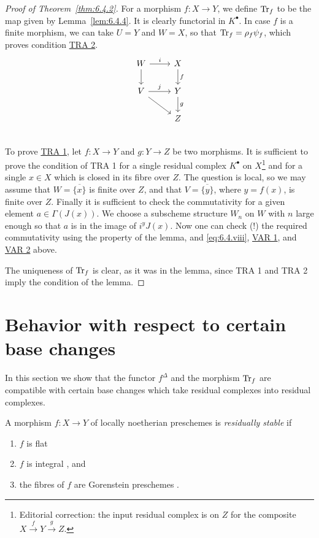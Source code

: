 \begin{proof}[Proof of Theorem~\ref{thm:6.4.2}]
For a morphism $f\colon X\to Y$, we define $\operatorname{Tr}_f$ to be the map given by Lemma~\ref{lem:6.4.4}. It is clearly functorial in $K^\bullet$. In case $f$ is a finite morphism, we can take $U=Y$ and $W=X$, so that $\operatorname{Tr}_f = \rho_f\psi_f$, which proves condition \hyperref[tra:6.4.2]{TRA 2}.
\[\begin{tikzcd}
	W\ar[r,"i"]\ar[d]&X\ar[d,"f"]\\
	V\ar[r,"j"]\ar[rd]&Y\ar[d,"g"]\\
	&Z\\
\end{tikzcd}\]
To prove \hyperref[tra:6.4.1]{TRA 1}, let $f\colon X\to Y$ and $g\colon Y\to Z$ be two morphisms. It is sufficient to prove the condition of TRA 1 for a single residual complex $K^\bullet$ on $X$\footnote{Editorial correction: the input residual complex is on $Z$ for the composite $X\xrightarrow{f}Y\xrightarrow{g}Z$.} and for a single $x\in X$ which is closed in its fibre over $Z$. The question is local, so we may assume that $W = \overline{\{x\}}$ is finite over $Z$, and that $V = \overline{\{y\}}$, where $y=f(x)$, is finite over $Z$. Finally it is sufficient to check the commutativity for a given element $a\in\Gamma(J(x))$. We choose a subscheme structure $W_n$ on $W$ with $n$ large enough so that $a$ is in the image of $i^{y}J(x)$. Now one can check (!) the required commutativity using the property of the lemma, and \eqref{eq:6.4.viii}, \hyperref[var:6.3.1]{VAR 1}, and \hyperref[var:6.3.2]{VAR 2} above.

The uniqueness of $\operatorname{Tr}_f$ is clear, as it was in the lemma, since TRA 1 and TRA 2 imply the condition of the lemma.

\end{proof}

\section{Behavior with respect to certain base changes}\label{sec:6.5}
\begingroup
\setlength{\emergencystretch}{2em}

In this section we show that the functor $f^{\Delta}$ and the morphism $\operatorname{Tr}_{f}$ are compatible with certain base changes which take residual complexes into residual complexes.

\begin{definition*}
A morphism $f\colon X\to Y$ of locally noetherian preschemes is \emph{residually stable} if
\begin{enumerate}
\item[a)] $f$ is flat
\item[b)] $f$ is integral \cite[\nopp II,~6.1.1]{EGA}, and
\item[c)] the fibres of $f$ are Gorenstein preschemes .
\end{enumerate}
\end{definition*}

